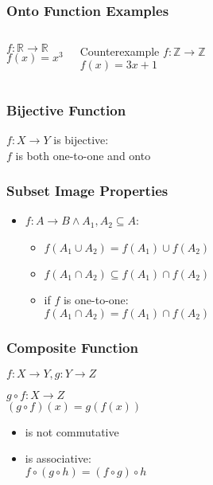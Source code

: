 \documentclass[dvipsnames]{beamer}
\begin{document}
\begin{frame}
  \frametitle{Onto Function Examples}

  \begin{columns}
    \begin{example}
      $f: \mathbb{R} \rightarrow \mathbb{R}$\\
      $f(x) = x^3$
    \end{example}

    \pause
    \begin{block}{Counterexample}
      $f: \mathbb{Z} \rightarrow \mathbb{Z}$\\
      $f(x) = 3x + 1$
    \end{block}
  \end{columns}
\end{frame}

\begin{frame}
  \frametitle{Bijective Function}

  \begin{definition}
    $f: X \rightarrow Y$ is \alert{bijective}:\\
    $f$ is both one-to-one and onto
  \end{definition}
\end{frame}

\begin{frame}
  \frametitle{Subset Image Properties}

  \begin{itemize}
    \item $f: A \rightarrow B \wedge A_1,A_2 \subseteq A$:

    \pause
    \medskip
    \begin{itemize}
      \item $f(A_1 \cup A_2) = f(A_1) \cup f(A_2)$
      \item $f(A_1 \cap A_2) \subseteq f(A_1) \cap f(A_2)$

      \pause
      \medskip
      \item if $f$ is one-to-one:\\
        $f(A_1 \cap A_2) = f(A_1) \cap f(A_2)$
    \end{itemize}
  \end{itemize}
\end{frame}

\begin{frame}
  \frametitle{Composite Function}

  \begin{definition}
    $f: X \rightarrow Y, g: Y \rightarrow Z$

    \medskip
    $g \circ f: X \rightarrow Z$\\
    $(g \circ f)(x) = g(f(x))$
  \end{definition}

  \begin{itemize}
    \item is not commutative
    \item is associative:\\
      $f \circ (g \circ h) = (f \circ g) \circ h$
  \end{itemize}
\end{frame}
\end{document}
